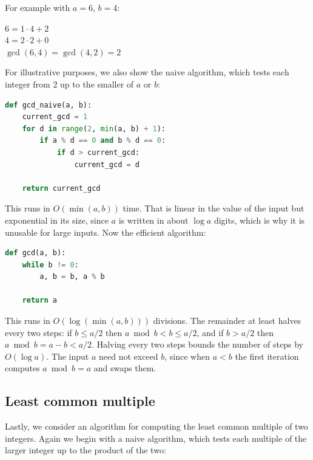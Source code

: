 For example with $a = 6$, $b = 4$:
\begin{center}
$6 = 1 \cdot 4 + 2$ \\
$4 = 2 \cdot 2 + 0$ \\
$\gcd(6, 4) = \gcd(4, 2) = 2$
\end{center}

For illustrative purposes, we also show the naive algorithm, which tests each integer from 2 up to the smaller of $a$ or $b$:

\medskip

\begin{lstlisting}[language=Python]
def gcd_naive(a, b):
    current_gcd = 1
    for d in range(2, min(a, b) + 1):
        if a % d == 0 and b % d == 0:
            if d > current_gcd:
                current_gcd = d

    return current_gcd
\end{lstlisting}

This runs in $O(\min(a, b))$ time. That is linear in the value of the input but exponential in its size, since $a$ is written in about $\log a$ digits, which is why it is unusable for large inputs. Now the efficient algorithm:

\medskip

\begin{lstlisting}[language=Python]
def gcd(a, b):
    while b != 0:
        a, b = b, a % b

    return a
\end{lstlisting}

This runs in $O(\log(\min(a, b)))$ divisions. The remainder at least halves every two steps: if $b \le a/2$ then $a \bmod b < b \le a/2$, and if $b > a/2$ then $a \bmod b = a - b < a/2$. Halving every two steps bounds the number of steps by $O(\log a)$. The input $a$ need not exceed $b$, since when $a < b$ the first iteration computes $a \bmod b = a$ and swaps them.

\newpage

\subsection{Least common multiple}

\medskip

Lastly, we consider an algorithm for computing the least common multiple of two integers. Again we begin with a naive algorithm, which tests each multiple of the larger integer up to the product of the two:

\medskip

